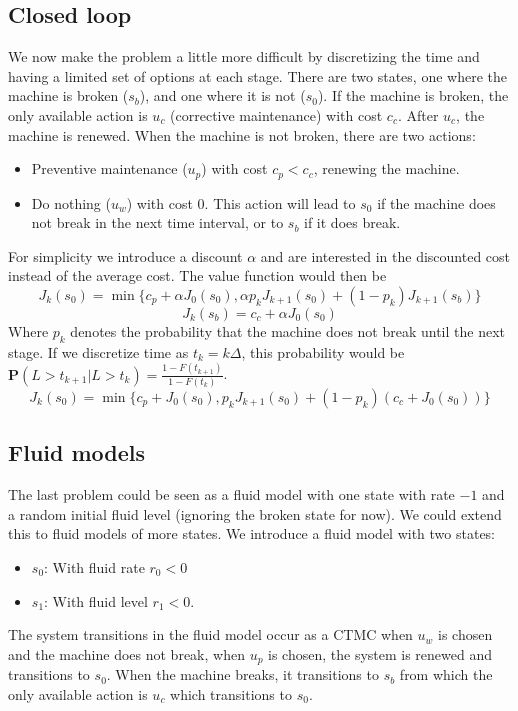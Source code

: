\subsection{Closed loop}
We now make the problem a little more difficult by discretizing the time and having a limited set of options at each stage.
There are two states, one where the machine is broken ($s_b$), and one where it is not ($s_0$). If the machine is broken, the only available action is $u_c$ (corrective maintenance) with cost $c_c$. After $u_c$, the machine is renewed. When the machine is not broken, there are two actions:
\begin{itemize}
\item Preventive maintenance ($u_p$) with cost $c_p<c_c$, renewing the machine.
\item Do nothing ($u_w$) with cost 0. This action will lead to $s_0$ if the machine does not break in the next time interval, or to $s_b$ if it does break.
\end{itemize}
For simplicity we introduce a discount $\alpha$ and are interested in the discounted cost instead of the average cost. The value function would then be 
$$
J_{k}(s_0)=\min\{c_p+\alpha J_0(s_0),\alpha p_kJ_{k+1}(s_0)+(1-p_k)J_{k+1}(s_b)\}
$$
$$
J_{k}(s_b)=c_c+\alpha J_0(s_0)
$$
Where $p_k$ denotes the probability that the machine does not break until the next stage. If we discretize time as $t_k=k\Delta$, this probability would be $\mathbf{P}(L>t_{k+1}|L>t_k)=\frac{1-F(t_{k+1})}{1-F(t_k)}$.
$$
J_{k}(s_0)=\min\{c_p+ J_0(s_0),p_k J_{k+1}(s_0)+(1-p_k) (c_c+ J_0(s_0))\}
$$

\subsection{Fluid models}
The last problem could be seen as a fluid model with one state with rate $-1$ and a random initial fluid level (ignoring the broken state for now). We could extend this to fluid models of more states.
We introduce a fluid model with two states: 
\begin{itemize}
\item $s_0$: With fluid rate $r_0<0$
\item $s_1$: With fluid level $r_1<0$.
\end{itemize}
The system transitions in the fluid model occur as a CTMC when $u_w$ is chosen and the machine does not break, when $u_p$ is chosen, the system is renewed and transitions to $s_0$. When the machine breaks, it transitions to $s_b$ from which the only available action is $u_c$ which transitions to $s_0$.\\

